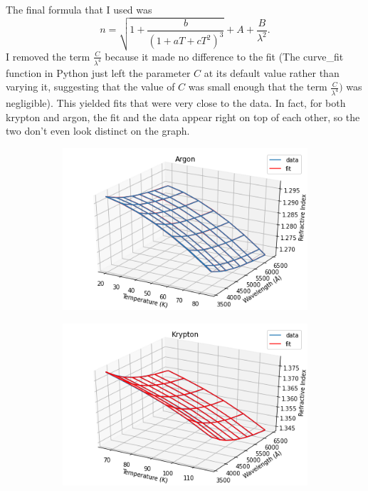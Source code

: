 \documentclass[letterpaper,12pt]{article}
\begin{document}
The final formula that I used was  
\begin{equation}
n=\sqrt{1+\frac{b}{(1+aT+cT^2)^3}}+A+\frac{B}{\lambda^2}.
\end{equation}
 I removed the term $\frac{C}{\lambda^4}$ because it made no difference to the fit (The curve\_fit function in Python just left the parameter $C$ at its default value rather than varying it, suggesting that the value of $C$ was small enough that the term $\frac{C}{\lambda^4})$ was negligible). This yielded fits that were very close to the data. In fact, for both krypton and argon, the fit and the data appear right on top of each other, so the two don't even look distinct on the graph.
\begin{figure}[h!]
	\begin{subfigure}[t]{0.5\linewidth}
		\centering
		\includegraphics[width=\textwidth,height=\textheight,keepaspectratio]{argongood.png}
	\end{subfigure}
	\begin{subfigure}[t]{0.5\linewidth}
		\centering
		\includegraphics[width=\textwidth,height=\textheight,keepaspectratio]{kryptongood.png}
	\end{subfigure}
\end{figure}
\end{document}
